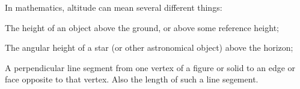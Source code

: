 In mathematics, altitude can mean several different things:
\par
The height of an object above the ground, or above some 
reference height;
\par
The angular height of a star (or other astronomical object)
above the horizon;
\par
A perpendicular line segment from one vertex of a figure or solid to an edge or face opposite to that vertex. Also the length of such a line segement.